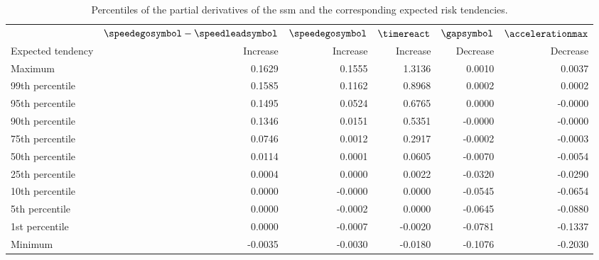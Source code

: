 \begin{table}
	\centering
	\caption{Percentiles of the partial derivatives of the \ac{ssm} and the corresponding expected risk tendencies.}
	\label{tab:tendencies}
	\begin{tabular}{lrrrrr}
		\toprule
		& $\speedegosymbol-\speedleadsymbol$ & $\speedegosymbol$ & $\timereact$ & $\gapsymbol$ & $\accelerationmax$ \\
		\otoprule
		Expected tendency & Increase & Increase & Increase & Decrease & Decrease \\
		Maximum         &  0.1629 &  0.1555 &  1.3136 &  0.0010 &  0.0037 \\
		99th percentile &  0.1585 &  0.1162 &  0.8968 &  0.0002 &  0.0002 \\
		95th percentile &  0.1495 &  0.0524 &  0.6765 &  0.0000 & -0.0000 \\
		90th percentile &  0.1346 &  0.0151 &  0.5351 & -0.0000 & -0.0000 \\
		75th percentile &  0.0746 &  0.0012 &  0.2917 & -0.0002 & -0.0003 \\
		50th percentile &  0.0114 &  0.0001 &  0.0605 & -0.0070 & -0.0054 \\
		25th percentile &  0.0004 &  0.0000 &  0.0022 & -0.0320 & -0.0290 \\
		10th percentile &  0.0000 & -0.0000 &  0.0000 & -0.0545 & -0.0654 \\
		 5th percentile &  0.0000 & -0.0002 &  0.0000 & -0.0645 & -0.0880 \\
		 1st percentile &  0.0000 & -0.0007 & -0.0020 & -0.0781 & -0.1337 \\
		Minimum         & -0.0035 & -0.0030 & -0.0180 & -0.1076 & -0.2030 \\
		\bottomrule
	\end{tabular}
\end{table}


